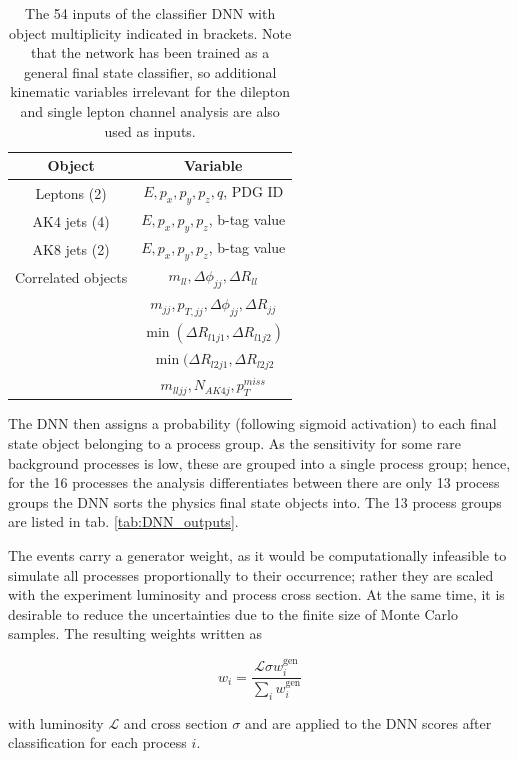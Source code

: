 \begin{table}[h!]
	\centering
	\begin{tabular}{cc}
		Object & Variable \\
		\hline
		Leptons (2) & $E, p_x, p_y, p_z, q$, PDG ID \\
		AK4 jets (4) & $E, p_x, p_y, p_z$, b-tag value \\
		AK8 jets (2) & $E, p_x, p_y, p_z$, b-tag value \\
		Correlated objects & $m_{ll}, \Delta\phi_{jj}, \Delta R_{ll}$ \\
		                   & $m_{jj}, p_{T, jj}, \Delta\phi_{jj}, \Delta R_{jj}$ \\
		                   & $\min(\Delta R_{l1j1}, \Delta R_{l1j2})$ \\
		                   & $\min(\Delta R_{l2j1}, \Delta R_{l2j2}$ \\
		                   & $m_{lljj}, N_{AK4j}, p^{miss}_T$
	\end{tabular}
	\caption{The 54 inputs of the classifier DNN with object multiplicity indicated in brackets. Note that the network has been trained as a general final state classifier, so additional kinematic variables irrelevant for the dilepton and single lepton channel analysis are also used as inputs.}
	\label{tab:DNN_inputs}
\end{table}

The DNN then assigns a probability (following sigmoid activation) to each final state object belonging to a process group. As the sensitivity for some rare background processes is low, these are grouped into a single process group; hence, for the 16 processes the analysis differentiates between there are only 13 process groups the DNN sorts the physics final state objects into. The 13 process groups are listed in tab. \ref{tab:DNN_outputs}.

The events carry a generator weight, as it would be computationally infeasible to simulate all processes proportionally to their occurrence; rather they are scaled with the experiment luminosity and process cross section. At the same time, it is desirable to reduce the uncertainties due to the finite size of Monte Carlo samples. The resulting weights written as

\begin{equation*}
	w_i = \frac{\mathcal{L}\sigma w^\text{gen}_i}{\sum\limits_i w^\text{gen}_i}
\end{equation*}

with luminosity $\mathcal{L}$ and cross section $\sigma$ and are applied to the DNN scores after classification for each process $i$.

